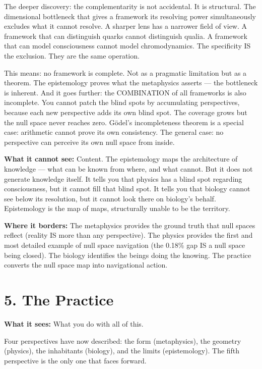 The deeper discovery: the complementarity is not accidental. It is structural. The dimensional bottleneck that gives a framework its resolving power simultaneously excludes what it cannot resolve. A sharper lens has a narrower field of view. A framework that can distinguish quarks cannot distinguish qualia. A framework that can model consciousness cannot model chromodynamics. The specificity IS the exclusion. They are the same operation.


This means: no framework is complete. Not as a pragmatic limitation but as a theorem. The epistemology proves what the metaphysics asserts — the bottleneck is inherent. And it goes further: the COMBINATION of all frameworks is also incomplete. You cannot patch the blind spots by accumulating perspectives, because each new perspective adds its own blind spot. The coverage grows but the null space never reaches zero. Gödel's incompleteness theorem is a special case: arithmetic cannot prove its own consistency. The general case: no perspective can perceive its own null space from inside.


\textbf{What it cannot see:} Content. The epistemology maps the architecture of knowledge — what can be known from where, and what cannot. But it does not generate knowledge itself. It tells you that physics has a blind spot regarding consciousness, but it cannot fill that blind spot. It tells you that biology cannot see below its resolution, but it cannot look there on biology's behalf. Epistemology is the map of maps, structurally unable to be the territory.


\textbf{Where it borders:} The metaphysics provides the ground truth that null spaces reflect (reality IS more than any perspective). The physics provides the first and most detailed example of null space navigation (the 0.18\% gap IS a null space being closed). The biology identifies the beings doing the knowing. The practice converts the null space map into navigational action.


\bigskip\noindent\makebox[\textwidth]{\color{rulegray}\rule{5cm}{0.3pt}}\bigskip


\section*{5. The Practice}


\textbf{What it sees:} What you do with all of this.


Four perspectives have now described: the form (metaphysics), the geometry (physics), the inhabitants (biology), and the limits (epistemology). The fifth perspective is the only one that faces forward.


